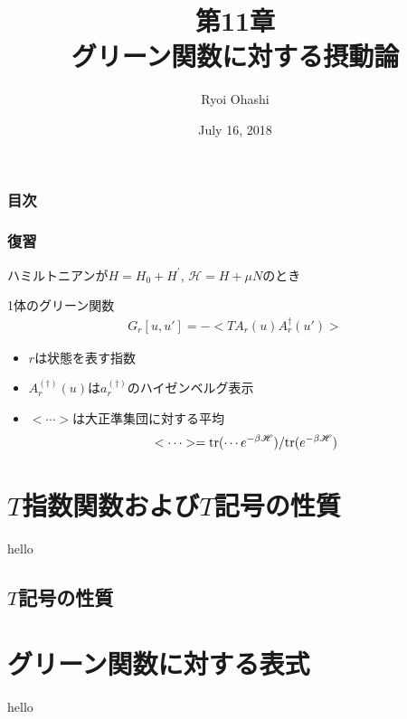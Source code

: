 \documentclass[dvipdfmx,11pt]{beamer}
\title{第11章\\グリーン関数に対する摂動論}
\author{Ryoi Ohashi}
\date{July 16, 2018}
\institute{Department of Applied Physics, Nagoya University}
\begin{document}
\begin{frame}[plain]
    \maketitle
\end{frame}

\begin{frame}\frametitle{目次}
    \setcounter{tocdepth}{1}
    \tableofcontents
\end{frame}

\begin{frame}\frametitle{復習}
    ハミルトニアンが$H=H_0+H^{'}$, $\mathscr{H}=H+\mu N$のとき
    \begin{block}{1体のグリーン関数}
        \begin{align}
            G_r[u,u'] = -<TA_r(u)A_r^{\dagger}(u')>
        \end{align}
    \end{block}
    \setcounter{equation}{2}
    \begin{itemize}
        \item $r$は状態を表す指数\\
        \item $A_r^{(\dagger)}(u)$は$a_r^{(\dagger)}$のハイゼンベルグ表示\\
        \item $<\cdots>$は大正準集団に対する平均\\
        \begin{align}
            <\cdots>={\rm tr}(\cdots e^{-\beta\mathscr{H}})/{\rm tr}(e^{-\beta\mathscr{H}})
        \end{align}
        
    \end{itemize}
\end{frame}

\section{$T$指数関数および$T$記号の性質}
\begin{frame}
    hello
\end{frame}
\subsection{$T$記号の性質}

\section{グリーン関数に対する表式}
\begin{frame}
    hello
\end{frame}
\end{document}
